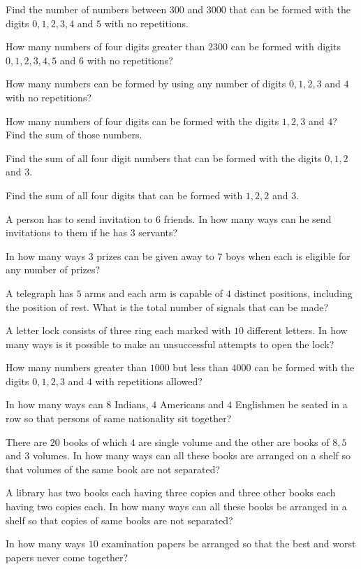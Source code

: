 \item Find the number of numbers between $300$ and $3000$ that can be formed with the digits $0, 1, 2, 3, 4$ and $5$ with no
  repetitions.
\item How many numbers of four digits greater than $2300$ can be formed with digits $0, 1, 2, 3, 4, 5$ and $6$ with no repetitions?
\item How many numbers can be formed by using any number of digits $0, 1, 2, 3$ and $4$ with no repetitions?
\item How many numbers of four digits can be formed with the digits $1, 2, 3$ and $4$? Find the sum of those numbers.
\item Find the sum of all four digit numbers that can be formed with the digits $0, 1, 2$ and $3$.
\item Find the sum of all four digits that can be formed with $1, 2, 2$ and $3$.
\item A person has to send invitation to $6$ friends. In how many ways can he send invitations to them if he has $3$ servants?
\item In how many ways $3$ prizes can be given away to $7$ boys when each is eligible for any number of prizes?
\item A telegraph has $5$ arms and each arm is capable of $4$ distinct positions, including the position of rest. What is the total
  number of signals that can be made?
\item A letter lock consists of three ring each marked with $10$ different letters. In how many ways is it possible to make an
  unsuccessful attempts to open the lock?
\item How many numbers greater than $1000$ but less than $4000$ can be formed with the digits $0, 1, 2, 3$ and $4$ with
  repetitions allowed?
\item In how many ways can $8$ Indians, $4$ Americans and $4$ Englishmen be seated in a row so that persons of same nationality sit
  together?
\item There are $20$ books of which $4$ are single volume and the other are books of $8, 5$ and $3$ volumes. In how many ways can
  all these books are arranged on a shelf so that volumes of the same book are not separated?
\item A library has two books each having three copies and three other books each having two copies each. In how many ways can all
  these books be arranged in a shelf so that copies of same books are not separated?
\item In how many ways $10$ examination papers be arranged so that the best and worst papers never come together?
